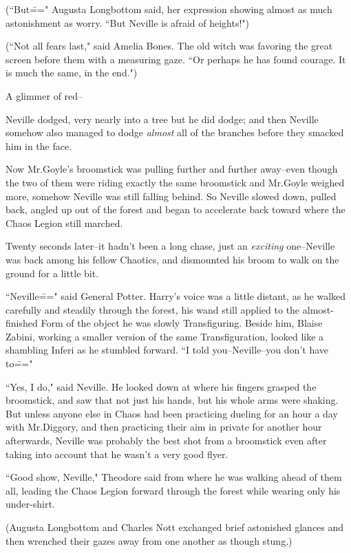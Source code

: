 (``But\===" Augusta Longbottom said, her expression showing almost as much astonishment as worry. ``But Neville is afraid of heights!")

(``Not all fears last," said Amelia Bones. The old witch was favoring the great screen before them with a measuring gaze. ``Or perhaps he has found courage. It is much the same, in the end.")

A glimmer of red\---

Neville dodged, very nearly into a tree but he did dodge; and then Neville somehow also managed to dodge \emph{almost} all of the branches before they smacked him in the face.

Now Mr.\?Goyle's broomstick was pulling further and further away\---even though the two of them were riding exactly the same broomstick and Mr.\?Goyle weighed more, somehow Neville was still falling behind. So Neville slowed down, pulled back, angled up out of the forest and began to accelerate back toward where the Chaos Legion still marched.

Twenty seconds later\---it hadn't been a long chase, just an \emph{exciting} one\---Neville was back among his fellow Chaotics, and dismounted his broom to walk on the ground for a little bit.

``Neville\===" said General Potter. Harry's voice was a little distant, as he walked carefully and steadily through the forest, his wand still applied to the almost-finished Form of the object he was slowly Transfiguring. Beside him, Blaise Zabini, working a smaller version of the same Transfiguration, looked like a shambling Inferi as he stumbled forward. ``I told you\---Neville\---you don't have to\==="

``Yes, I do," said Neville. He looked down at where his fingers grasped the broomstick, and saw that not just his hands, but his whole arms were shaking. But unless anyone else in Chaos had been practicing dueling for an hour a day with Mr.\?Diggory, and then practicing their aim in private for another hour afterwards, Neville was probably the best shot from a broomstick even after taking into account that he wasn't a very good flyer.

``Good show, Neville," Theodore said from where he was walking ahead of them all, leading the Chaos Legion forward through the forest while wearing only his under-shirt.

(Augusta Longbottom and Charles Nott exchanged brief astonished glances and then wrenched their gazes away from one another as though stung.)

